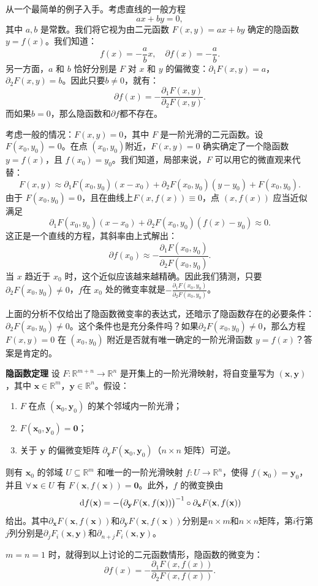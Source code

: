 \documentclass[12pt,UTF8,fontset=none]{ctexbook}
\begin{document}
从一个最简单的例子入手。考虑直线的一般方程
\[
ax+by=0,
\]
其中 $a,b$ 是常数。我们将它视为由二元函数 $F(x,y)=ax+by$ 确定的隐函数 $y=f(x)$。我们知道：
\[
f(x)=-\frac{a}{b}x,\quad \partial f(x) = -\frac{a}{b}.
\]
另一方面，$a$ 和 $b$ 恰好分别是 $F$ 对 $x$ 和 $y$ 的偏微变：$\partial_1F(x,y)=a$，$\partial_2F(x,y)=b$。因此只要$b\neq 0$，就有：
\[
\partial f(x)=-\frac{\partial_1F(x,y)}{\partial_2F(x,y)}.
\]
而如果$b = 0$，那么隐函数和$\partial f$都不存在。

考虑一般的情况：$F(x,y)=0$，其中 $F$ 是一阶光滑的二元函数。设$F(x_0,y_0)=0$。在点 $(x_0,y_0)$附近，$F(x,y)=0$ 确实确定了一个隐函数 $y=f(x)$，且 $f(x_0)=y_0$。我们知道，局部来说，$F$ 可以用它的微直观来代替：
\[
F(x,y)\approx \partial_1F(x_0,y_0)(x-x_0)+\partial_2F(x_0,y_0)(y-y_0)+F(x_0,y_0).
\]
由于 $F(x_0,y_0)=0$，且在曲线上$F(x,f(x))\equiv0$，点 $(x,f(x))$ 应当近似满足
\[
\partial_1F(x_0,y_0)(x-x_0)+\partial_2F(x_0,y_0)(f(x)-y_0)\approx0.
\]
这正是一个直线的方程，其斜率由上式解出：
\[
\partial f(x_0)\approx -\frac{\partial_1F(x_0,y_0)}{\partial_2F(x_0,y_0)}.
\]
当 $x$ 趋近于 $x_0$ 时，这个近似应该越来越精确。因此我们猜测，只要 $\partial_2F(x_0,y_0)\neq0$，$f$在 $x_0$ 处的微变率就是$\displaystyle -\frac{\partial_1F(x_0,y_0)}{\partial_2F(x_0,y_0)}$。

上面的分析不仅给出了隐函数微变率的表达式，还暗示了隐函数存在的必要条件：$\partial_2F(x_0,y_0)\neq0$。这个条件也是充分条件吗？如果$\partial_2F(x_0,y_0)\neq0$，那么方程 $F(x,y)=0$ 在 $(x_0,y_0)$ 附近是否就有唯一确定的一阶光滑函数 $y=f(x)$？答案是肯定的。
\begin{tm}{\textbf{隐函数定理}}\label{tm:2-2-10}
设 $F:\mathbb{R}^{m+n}\to\mathbb{R}^n$ 是开集上的一阶光滑映射，将自变量写为 $(\mathbf{x},\mathbf{y})$，其中 $\mathbf{x}\in\mathbb{R}^m$，$\mathbf{y}\in\mathbb{R}^n$。假设：
\begin{enumerate}[label=\arabic*.]
    \item $F$ 在点 $(\mathbf{x}_0,\mathbf{y}_0)$ 的某个邻域内一阶光滑；
    \item $F(\mathbf{x}_0,\mathbf{y}_0)=\mathbf{0}$；
    \item 关于 $\mathbf{y}$ 的偏微变矩阵 $\partial_{\mathbf{y}}F(\mathbf{x}_0,\mathbf{y}_0)$（$n\times n$ 矩阵）可逆。
\end{enumerate}
则有 $\mathbf{x}_0$ 的邻域 $U\subseteq\mathbb{R}^m$ 和唯一的一阶光滑映射 $f:U\to\mathbb{R}^n$，使得 $f(\mathbf{x}_0)=\mathbf{y}_0$，并且 $\forall\,\mathbf{x}\in U$ 有 $F(\mathbf{x},f(\mathbf{x}))=\mathbf{0}$。此外，$f$ 的微变换由
\[
\,\mathrm{d} f(\mathbf{x}) = -\bigl(\partial_{\mathbf{y}}F(\mathbf{x},f(\mathbf{x}))\bigr)^{-1}\circ\partial_{\mathbf{x}}F(\mathbf{x},f(\mathbf{x}))
\]
给出。其中$\partial_{\mathbf{x}}F(\mathbf{x},f(\mathbf{x}))$和$\partial_{\mathbf{y}}F(\mathbf{x},f(\mathbf{x}))$分别是$n\times m$和$n\times n$矩阵，第$i$行第$j$列分别是$\partial_j F_{i}(\mathbf{x},\mathbf{y})$和$\partial_{n+j} F_i(\mathbf{x},\mathbf{y})$。
\end{tm}
$m=n=1$ 时，就得到以上讨论的二元函数情形，隐函数的微变为：
\[
\partial f(x)=-\frac{\partial_1F(x,f(x))}{\partial_2F(x,f(x))}.
\]
\end{document}
